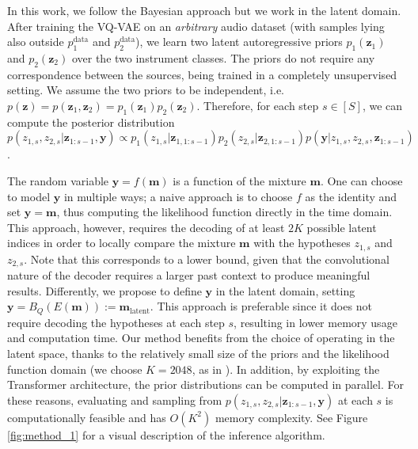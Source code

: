 \documentclass[a4paper]{article}
\begin{document}
     In this work, we follow the Bayesian approach but we work in the latent domain.
     After training the VQ-VAE on an {\em arbitrary} audio dataset (with samples lying also outside $p_1^{\text{data}}$ and $p_2^{\text{data}}$), we learn two latent autoregressive priors $p_1(\mathbf{z}_1)$ and $p_2(\mathbf{z}_2)$ over the two instrument classes. The priors do not require any correspondence between the sources, being trained in a completely unsupervised setting. We assume the two priors to be independent, i.e. $p(\mathbf{z}) = p(\mathbf{z}_1, \mathbf{z}_2) = p_1(\mathbf{z}_1)p_2(\mathbf{z}_2)$. Therefore, for each step $s \in [S]$, we can compute the posterior distribution 
          $p(z_{1,s}, z_{2,s} | \mathbf{z}_{1:s-1}, \mathbf{y}) \propto p_1(z_{1,s}|\mathbf{z}_{1,1:s-1})p_2(z_{2,s}|\mathbf{z}_{2,1:s-1})p(\mathbf{y}|z_{1,s},z_{2,s}, \mathbf{z}_{1:s-1})$.
          
          The random variable $\mathbf{y}=f(\mathbf{m})$ is a function of the mixture $\mathbf{m}$.
One can choose to model $\mathbf{y}$ in multiple ways; a naive approach is to choose $f$ as the identity and set $\mathbf{y} = \mathbf{m}$, thus computing  the likelihood function directly in the time domain. This approach, however, requires the  decoding of at least $2K$ possible latent indices in order to locally compare the mixture $\mathbf{m}$ with the hypotheses $z_{1,s}$ and $z_{2, s}$. Note that this corresponds to a lower bound, given that the convolutional nature of the decoder requires a larger past context to produce meaningful results. Differently, we propose to define $\mathbf{y}$ in the latent domain, setting $\mathbf{y} = B_Q(E(\mathbf{m})) := \mathbf{m}_{\text{latent}}$. This approach is preferable since it does not require decoding the hypotheses at each step $s$, resulting in lower memory usage and computation time.
Our method benefits from the choice of operating in the latent space, thanks to the relatively small size of the priors and the likelihood function domain (we choose $K = 2048$, as in \cite{dhariwal:2020}). 
          In addition, by exploiting the Transformer architecture, the prior distributions can be computed in parallel. For these reasons, evaluating and sampling from $p(z_{1,s}, z_{2,s} | \mathbf{z}_{1:s-1}, \mathbf{y})$  at each $s$ is computationally feasible and has $O(K^2)$ memory complexity. See Figure \ref{fig:method_1} for a visual description of the inference algorithm.
 

         
\end{document}
